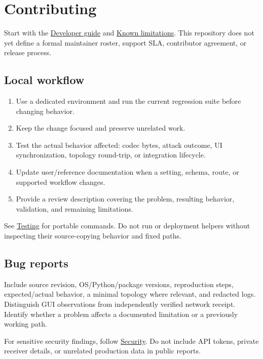 \chapter{Contributing}\label{chapter-14}
Start with the \hyperref[chapter-13]{Developer guide} and \hyperref[chapter-16]{Known limitations}. This repository does not yet define a formal maintainer roster, support SLA, contributor agreement, or release process.

\section*{Local workflow}
\begin{enumerate}
\item Use a dedicated environment and run the current regression suite before changing behavior.
\item Keep the change focused and preserve unrelated work.
\item Test the actual behavior affected: codec bytes, attack outcome, UI synchronization, topology round-trip, or integration lifecycle.
\item Update user/reference documentation when a setting, schema, route, or supported workflow changes.
\item Provide a review description covering the problem, resulting behavior, validation, and remaining limitations.
\end{enumerate}

See \hyperref[chapter-15]{Testing} for portable commands. Do not run  or deployment helpers without inspecting their source-copying behavior and fixed paths.

\section*{Bug reports}
Include source revision, OS/Python/package versions, reproduction steps, expected/actual behavior, a minimal topology where relevant, and redacted logs. Distinguish GUI observations from independently verified network receipt. Identify whether a problem affects a documented limitation or a previously working path.

For sensitive security findings, follow \hyperref[chapter-12]{Security}. Do not include API tokens, private receiver details, or unrelated production data in public reports.

